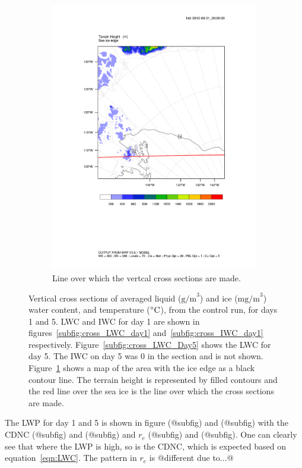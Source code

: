 \begin{figure}[h]
\begin{subfigure}{0.48\textwidth}
        \includegraphics[width=\textwidth]{results/crossSec_line.pdf}
        \caption{Line over which the vertcal cross sections are made.}
        \label{subfig:cross_line}
    \end{subfigure}
    \caption{Vertical cross sections of averaged liquid ($\text{g/m}^3$) and ice  ($\text{mg/m}^3$) water content, and temperature ($\degree\text{C}$), from the control run, for days 1 and 5. LWC and IWC for day 1 are shown in figures~\ref{subfig:cross_LWC_day1} and~\ref{subfig:cross_IWC_day1} respectively. Figure~\ref{subfig:cross_LWC_Day5} shows the LWC for day 5. The IWC on day 5 was 0 in the section and is not shown. Figure~\ref{subfig:cross_line} shows a map of the area with the ice edge as a black contour line. The terrain height is represented by filled contours and the red line over the sea ice is the line over which the cross sections are made.}
    \label{fig:weather}
\end{figure}

The LWP for day 1 and 5 is shown in figure (@subfig) and (@subfig) with the CDNC (@subfig) and (@subfig) and $r_e$ (@subfig) and (@subfig). One can clearly see that where the LWP is high, so is the CDNC, which is expected based on equation~\ref{eqn:LWC}. The pattern in $r_e$ is @different due to...@

